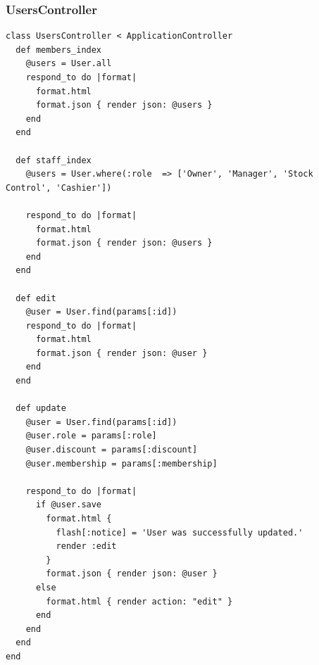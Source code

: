 \documentclass[a4paper]{article}
\begin{document}
\subsubsection{UsersController}
\begin{verbatim}
class UsersController < ApplicationController
  def members_index
    @users = User.all
    respond_to do |format|
      format.html
      format.json { render json: @users }
    end
  end

  def staff_index
    @users = User.where(:role  => ['Owner', 'Manager', 'Stock Control', 'Cashier'])

    respond_to do |format|
      format.html
      format.json { render json: @users }
    end
  end
  
  def edit
    @user = User.find(params[:id])
    respond_to do |format|
      format.html
      format.json { render json: @user }
    end
  end

  def update
    @user = User.find(params[:id])
    @user.role = params[:role]
    @user.discount = params[:discount]
    @user.membership = params[:membership]

    respond_to do |format|
      if @user.save     
        format.html { 
          flash[:notice] = 'User was successfully updated.'
          render :edit
        }
        format.json { render json: @user }
      else
        format.html { render action: "edit" }
      end
    end
  end
end

\end{verbatim}
\end{document}
